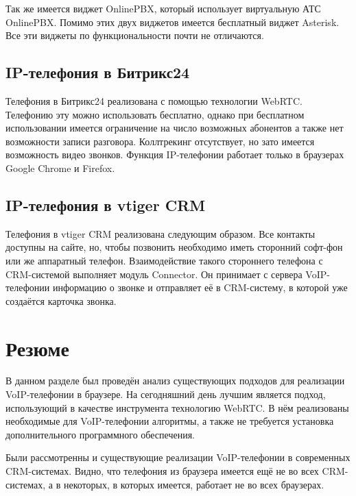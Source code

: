 Так же имеется виджет OnlinePBX, который использует виртуальную АТС OnlinePBX. Помимо этих двух виджетов имеется бесплатный виджет Asterisk. Все эти виджеты по функциональности почти не отличаются.

\subsection{IP-телефония в Битрикс24}

Телефония в Битрикс24 реализована с помощью технологии WebRTC. Телефонию эту можно использовать бесплатно, однако при бесплатном использовании имеется ограничение на число возможных абонентов а также нет возможности записи разговора. Коллтрекинг отсутствует, но зато имеется возможность видео звонков. Функция IP-телефонии работает только в браузерах Google Chrome и Firefox.\cite{bitrix24}

\subsection{IP-телефония в vtiger CRM}

Телефония в vtiger CRM реализована следующим образом. Все контакты доступны на сайте, но, чтобы позвонить необходимо иметь сторонний софт-фон или же аппаратный телефон. Взаимодействие такого стороннего телефона с CRM-системой выполняет модуль Connector. Он принимает с сервера VoIP-телефонии информацию о звонке и отправляет её в CRM-систему, в которой уже создаётся карточка звонка.

\section{Резюме}

В данном разделе был проведён анализ существующих подходов для реализации VoIP-телефонии в браузере. На сегодняшний день лучшим является подход, использующий в качестве инструмента технологию WebRTC. В нём реализованы необходимые для VoIP-телефонии алгоритмы, а также не требуется установка дополнительного программного обеспечения.

Были рассмотренны и существующие реализации VoIP-телефонии в современных CRM-системах. Видно, что телефония из браузера имеется ещё не во всех CRM-системах, а в некоторых, в которых имеется, работает не во всех браузерах.
